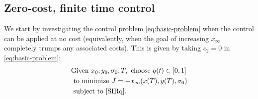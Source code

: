 \documentclass[english,12pt]{article}
\begin{document}
\subsection{Zero-cost, finite time control}
We start by investigating the control problem \eqref{eq:basic-problem} when the control
can be applied at no cost (equivalently, when the goal of increasing $x_\infty$ completely
trumps any associated costs).  This is given by taking $c_2 = 0$ in \eqref{eq:basic-problem}:
\begin{align} \label{eq:no-cost-problem}
\begin{aligned}
& \text{Given } x_0, y_0, \sigma_0, T, \text{ choose } q(t) \in [0,1] \\
& \text{ to minimize }  J = -x_\infty(x(T),y(T),\sigma_0) \\
& \text{ subject to } \eqref{SIRq}.
\end{aligned}
\end{align}
\end{document}
